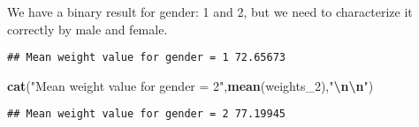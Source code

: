 \documentclass[
]{article}
\newenvironment{Shaded}{\begin{snugshade}}{\end{snugshade}}
\newcommand{\DecValTok}[1]{\textcolor[rgb]{0.00,0.00,0.81}{#1}}
\newcommand{\FunctionTok}[1]{\textcolor[rgb]{0.13,0.29,0.53}{\textbf{#1}}}
\newcommand{\NormalTok}[1]{#1}
\newcommand{\OtherTok}[1]{\textcolor[rgb]{0.56,0.35,0.01}{#1}}
\newcommand{\SpecialCharTok}[1]{\textcolor[rgb]{0.81,0.36,0.00}{\textbf{#1}}}
\newcommand{\StringTok}[1]{\textcolor[rgb]{0.31,0.60,0.02}{#1}}
\begin{document}
We have a binary result for gender: 1 and 2, but we need to characterize
it correctly by male and female.

\begin{Shaded}
\end{Shaded}

\begin{verbatim}
## Mean weight value for gender = 1 72.65673
\end{verbatim}

\begin{Shaded}
\begin{Highlighting}[]
\FunctionTok{cat}\NormalTok{(}\StringTok{"Mean weight value for gender = 2"}\NormalTok{,}\FunctionTok{mean}\NormalTok{(weights\_2),}\StringTok{"}\SpecialCharTok{\textbackslash{}n\textbackslash{}n}\StringTok{"}\NormalTok{)}
\end{Highlighting}
\end{Shaded}

\begin{verbatim}
## Mean weight value for gender = 2 77.19945
\end{verbatim}

\begin{Shaded}
\end{Shaded}
\end{document}
